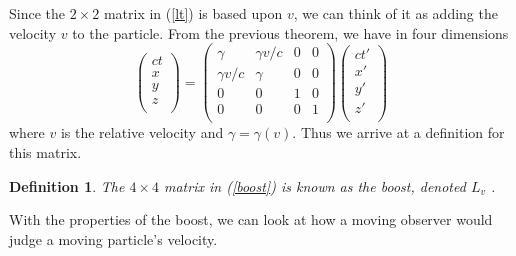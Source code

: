 \documentclass[12pt]{article}
\theoremstyle{defn}
\newtheorem{defn}{Definition}
\theoremstyle{pf}
\newcommand{\0}{\emptyset}
\renewcommand{\-}{\setminus}
\begin{document}
Since the $2\times2$ matrix in (\ref{lt}) is based upon $v$, we can think of it as adding the velocity $v$ to the particle. From the previous theorem, we have in four dimensions \begin{equation}\label{boost}\left(\begin{array}{c}ct\\                                                                                                                            x\\
y\\
z\\
\end{array}\right)=\left(\begin{array}{cccc}\gamma & \gamma v/c & 0 & 0\\
\gamma v/c & \gamma & 0 & 0\\
0 & 0 & 1 & 0\\
0 & 0 & 0 & 1\\
\end{array}
\right)\left(\begin{array}{c}ct'\\
x'\\
y'\\
z'\\
\end{array}\right)\end{equation} where $v$ is the relative velocity and $\gamma=\gamma(v)$. Thus we arrive at a definition for this matrix.

\begin{defn}
The $4\times4$ matrix in (\ref{boost}) is known as the \textit{boost}, denoted $L_v$ \cite{woodhouse}. \end{defn}

With the properties of the boost, we can look at how a moving observer would judge a moving particle's velocity.
\end{document}
